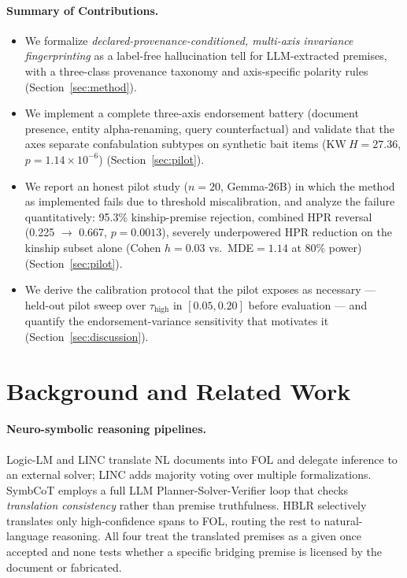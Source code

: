 \documentclass[11pt,letterpaper]{article}
\begin{document}
\paragraph{Summary of Contributions.}
\begin{itemize}
  \item We formalize \textit{declared-provenance-conditioned, multi-axis invariance fingerprinting} as a label-free hallucination tell for LLM-extracted premises, with a three-class provenance taxonomy and axis-specific polarity rules (Section~\ref{sec:method}).
  \item We implement a complete three-axis endorsement battery (document presence, entity alpha-renaming, query counterfactual) and validate that the axes separate confabulation subtypes on synthetic bait items ($\mathrm{KW}\ H=27.36$, $p=1.14\times10^{-6}$) (Section~\ref{sec:pilot}).
  \item We report an honest pilot study ($n=20$, Gemma-26B) in which the method as implemented fails due to threshold miscalibration, and analyze the failure quantitatively: 95.3\% kinship-premise rejection, combined HPR reversal (0.225 $\to$ 0.667, $p=0.0013$), severely underpowered HPR reduction on the kinship subset alone (Cohen $h=0.03$ vs.\ MDE$=1.14$ at 80\% power) (Section~\ref{sec:pilot}).
  \item We derive the calibration protocol that the pilot exposes as necessary --- held-out pilot sweep over $\tau_{\mathrm{high}}$ in $[0.05, 0.20]$ before evaluation --- and quantify the endorsement-variance sensitivity that motivates it (Section~\ref{sec:discussion}).
\end{itemize}

\section{Background and Related Work}

\paragraph{Neuro-symbolic reasoning pipelines.}
Logic-LM \citep{Pan2023} and LINC \citep{Olausson2023} translate NL documents into FOL and delegate inference to an external solver; LINC adds majority voting over multiple formalizations. SymbCoT \citep{Liu2024} employs a full LLM Planner-Solver-Verifier loop that checks \textit{translation consistency} rather than premise truthfulness. HBLR \citep{Li2025} selectively translates only high-confidence spans to FOL, routing the rest to natural-language reasoning. All four treat the translated premises as a given once accepted and none tests whether a specific bridging premise is licensed by the document or fabricated.
\end{document}
